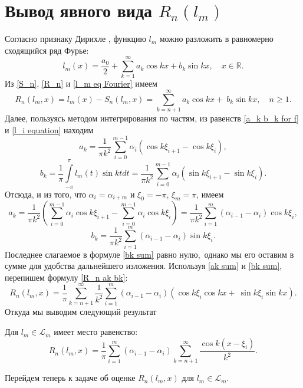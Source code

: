 \section{Вывод явного вида $R_n(l_m)$}
Согласно признаку Дирихле \cite{fiht_diff_v3}, функцию $l_m$ можно разложить в равномерно сходящийся ряд Фурье:
\begin{equation}
l_m(x) = \frac{a_0}{2} + \sum\limits_{k=1}^{\infty} a_k \cos kx + b_k \sin
kx, \quad x \in \mathbb{R}. \label{l_m eq Fourier}
\end{equation}
Из \eqref{S_n}, \eqref{R_n} и \eqref{l_m eq Fourier} имеем
\begin{equation}
R_n(l_m,x) = l_m(x) - S_n(l_m,x) = \sum\limits_{k=n+1}^{\infty} a_k \cos kx +\ b_k \sin kx, \quad n \geq 1.\label{R_n ak bk}
\end{equation}
Далее, пользуясь методом интегрирования по частям, из равенств \eqref{a_k b_k for f} и \eqref{l_i equation} находим
\begin{equation}
a_k = \frac1{\pi k^2} \sum\limits_{i=0}^{m-1} \alpha_i(\cos k\xi_{i+1} - \cos k \xi_i),
\end{equation}
\begin{equation}
b_k = \frac1\pi\int\limits_{-\pi}^{\pi} l_m(t) \sin kt dt = \frac1{\pi k^2}\sum_{i=0}^{m-1}\alpha_i(\sin k \xi_{i+1} - \sin k \xi_i).
\end{equation}
Отсюда, и из того, что $\alpha_i = \alpha_{i+m}$ и $\xi_0 = -\pi$, $\xi_m = \pi$, имеем
\begin{equation}
a_k = \frac1{\pi k^2}
\left(\sum\limits_{i=0}^{m-1} \alpha_i\cos k\xi_{i+1} - \sum\limits_{i=0}^{m-1} \alpha_i\cos k \xi_i\right)
 = \frac{1}{\pi k^2} \sum\limits_{i=1}^{m} (\alpha_{i-1}-\alpha_i) \cos k \xi_i,\label{ak sum}
\end{equation}
\begin{equation}
b_k = \frac{1}{\pi k^2} \sum\limits_{i=1}^{m} (\alpha_{i-1} - \alpha_i)\sin k\xi_i.\label{bk sum}
\end{equation}
Последнее слагаемое в формуле \eqref{bk sum} равно нулю,\ однако мы его оставим в сумме для удобства дальнейшего изложения.
Используя \eqref{ak sum} и \eqref{bk sum}, перепишем формулу \eqref{R_n ak bk}:
\begin{equation}
R_n(l_m,x) = \frac{1}{\pi}\sum\limits_{k=n+1}^{\infty}\frac{1}{k^2}  \sum\limits_{i=1}^{m} (\alpha_{i-1} - \alpha_i)\left(\cos k\xi_i \cos kx +\ \sin k\xi_i \sin kx\right).
\end{equation}
Откуда мы выводим следующий результат
\begin{lemma} \label{lemma R_n}
Для $l_m \in \mathcal{L}_m$ имеет место равенство:
\begin{equation}
R_n(l_m,x) = \frac{1}{\pi}\sum\limits_{i=1}^{m}(\alpha_{i-1}-\alpha_i)\sum\limits_{k=n+1}^{\infty}\frac{\cos k(x - \xi_i)}{k^2}.\label{R_n formula}
\end{equation}
\end{lemma}
Перейдем теперь к задаче об оценке $R_n(l_m,x)$ для $l_m \in \mathcal{L}_m$.


